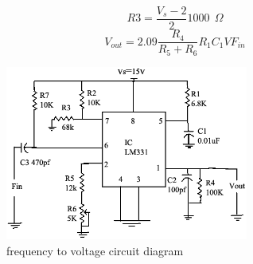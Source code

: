 \documentclass[conference]{IEEEtran}
\begin{document}
\begin{equation} \label{eq:6}
 R3= \frac{V_s-2}{2}1000\ \ \Omega           
 \end{equation}               
\begin{equation} \label{eq:4}
V_{out} = 2.09\frac{R_4}{R_5+R_6}R_1C_1VF_{in}  
\end{equation}            
\begin{figure}[h]
\includegraphics[width=8cm]{ftov.png}
\centering
\caption{frequency to voltage circuit diagram}\label{ftov_img}
\end{figure}
\end{document}
